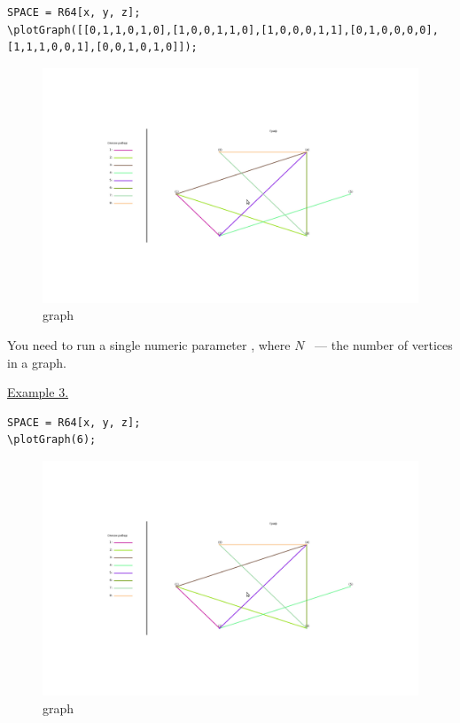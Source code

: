 \vspace*{-2mm}
\begin{verbatim}
SPACE = R64[x, y, z];
\plotGraph([[0,1,1,0,1,0],[1,0,0,1,1,0],[1,0,0,0,1,1],[0,1,0,0,0,0],
[1,1,1,0,0,1],[0,0,1,0,1,0]]);
\end{verbatim}
\begin{figure}[!ht]
 \includegraphics[scale=0.4]{pictures/4_2}
\caption{graph}
\label{4_2}
\end{figure}

You need to run a single numeric parameter
, 
where $N$ ~--- the number of vertices in a graph.

\underline{Example 3. }

\vspace*{-2mm}
\begin{verbatim}
SPACE = R64[x, y, z];
\plotGraph(6);
\end{verbatim}
\begin{figure}[!ht]
 \includegraphics[scale=0.4]{pictures/4_2}
\caption{graph}
\label{4_3}
\end{figure}

